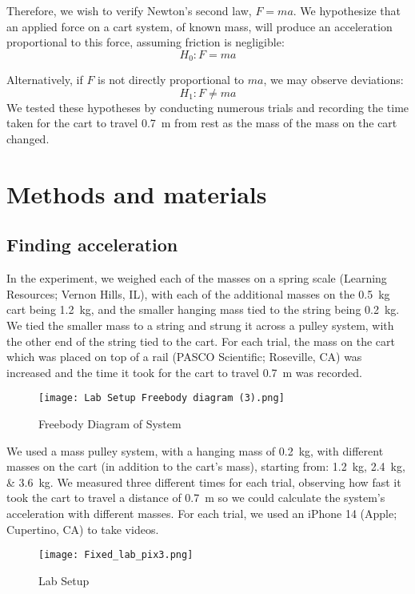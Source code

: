 \documentclass[reprint,amsmath,amssymb.aps]{revtex4-2}
\begin{document}
Therefore, we wish to verify Newton's second law, $F = ma$. We hypothesize that an applied force on a cart system, of known mass, will produce an acceleration proportional to this force, assuming friction is negligible:
\begin{equation} 
H_0: F = ma 
\label{eq:2}
\end{equation}

Alternatively, if $F$ is not directly proportional to $ma$, we may observe deviations:
\begin{equation} 
H_1: F \neq ma
\label{eq:3}
\end{equation}
We tested these hypotheses by conducting numerous trials and recording the time taken for the cart to travel \qty{0.7}{\meter} from rest as the mass of the mass on the cart changed.







\section{Methods and materials}

\subsection{Finding acceleration}
In the experiment, we weighed each of the masses on a spring scale (Learning Resources; Vernon Hills, IL), with each of the additional masses on the \qty{0.5}{\kilo\gram} cart being \qty{1.2}{\kilo\gram}, and the smaller hanging mass tied to the string being \qty{0.2}{\kilo\gram}. We tied the smaller mass to a string and strung it across a pulley system, with the other end of the string tied to the cart. For each trial, the mass on the cart which was placed on top of a rail (PASCO Scientific; Roseville, CA) was increased and the time it took for the cart to travel \qty{0.7}{\meter} was recorded.
\begin{figure} %
\centering
\texttt{[image: Lab Setup Freebody diagram (3).png]}
\caption{Freebody Diagram of System}
\label{fig:enter-label}
\end{figure}


We used a mass pulley system, with a hanging mass of \qty{0.2}{\kilo\gram}, with different masses on the cart (in addition to the cart's mass), starting from: \qtylist{1.2;2.4;3.6}{\kilo\gram}. We measured three different times for each trial, observing how fast it took the cart to travel a distance of \qty{0.7}{\meter} so we could calculate the system's acceleration with different masses. For each trial, we used an iPhone 14 (Apple; Cupertino, CA) to take videos.
\begin{figure} %
\centering
\texttt{[image: Fixed\_lab\_pix3.png]}
\caption{Lab Setup}
\label{fig:lab_setup}
\end{figure} 
\end{document}
